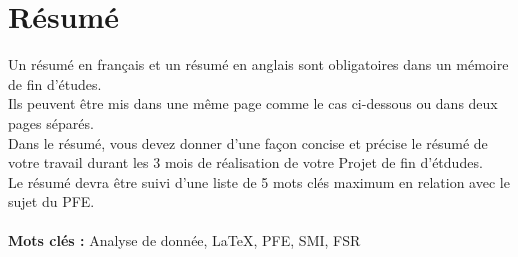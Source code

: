 \chapter*{Résumé}




Un résumé en français et un résumé en anglais sont obligatoires dans un mémoire de fin d'études.\\

Ils peuvent être mis dans une même page comme le cas ci-dessous ou dans deux pages séparés.\\

Dans le résumé, vous devez donner d'une façon concise et précise le résumé de votre travail durant les 3 mois de réalisation de votre Projet de fin d'étdudes.\\

Le résumé devra être suivi d'une liste de 5 mots clés maximum en relation avec le sujet du PFE.
\\
\\  
{\large\textbf{Mots clés :}}
Analyse de donnée, LaTeX, PFE, SMI, FSR
